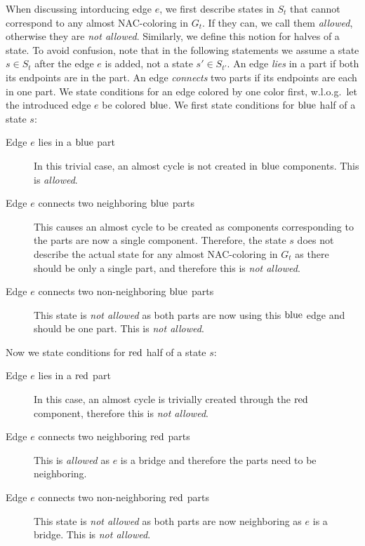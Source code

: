 When discussing \IntroduceEdgeNode{} intorducing edge \( e \),
we first describe states in \( S_{t} \)
that cannot correspond to any almost NAC-coloring in \( G_t \).
If they can, we call them \emph{allowed}, otherwise they are \emph{not allowed}.
Similarly, we define this notion for halves of a state.
To avoid confusion, note that in the following statements we assume
a state \( s \in S_t \) after the edge \( e \) is added, not a state \( s' \in S_{t'} \).
%
An edge \emph{lies} in a part if both its endpoints are in the part.
An edge \emph{connects} two parts if its endpoints are each in one part.
%
We state conditions for an edge colored by one color first,
w.l.o.g.\ let the introduced edge \( e \) be colored \( \text{blue} \).
We first state conditions for \( \text{blue} \) half of a state \( s \):
%
\begin{description}
	\item[Edge \( e \) lies in a \( \text{blue} \) part]
	      In this trivial case, an almost cycle is not created in \( \text{blue} \) components.
	      This is \emph{allowed}.
	\item[Edge \( e \) connects two neighboring \( \text{blue} \) parts]
	      This causes an almost cycle to be created as
	      components corresponding to the parts
	      are now a single component.
	      Therefore, the state \( s \) does not describe
	      the actual state for any almost NAC-coloring in \( G_t \)
	      as there should be only a single part, and therefore this is \emph{not allowed}.
	\item[Edge \( e \) connects two non-neighboring \( \text{blue} \) parts]
	      This state is \emph{not allowed} as both parts
	      are now using this \( \text{blue} \) edge and should be one part.
	      This is \emph{not allowed}.
\end{description}
%
Now we state conditions for \( \text{red} \) half of a state \( s \):
%
\begin{description}
	\item[Edge \( e \) lies in a \( \text{red} \) part]
	      In this case, an almost cycle is trivially created
	      through the \( \text{red} \) component,
	      therefore this is \emph{not allowed}.
	\item[Edge \( e \) connects two neighboring \( \text{red} \) parts]
	      This is \emph{allowed} as \( e \) is a bridge and
	      therefore the parts need to be neighboring.
	\item[Edge \( e \) connects two non-neighboring \( \text{red} \) parts]
	      This state is \emph{not allowed} as both parts
	      are now neighboring as \( e \) is a bridge.
	      This is \emph{not allowed}.
\end{description}
%


